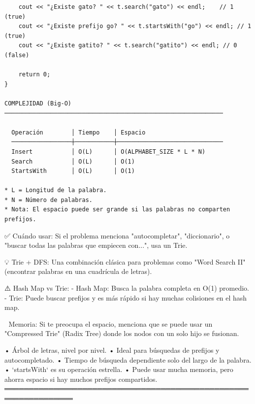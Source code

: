 \begin{lstlisting}
    cout << "¿Existe gato? " << t.search("gato") << endl;    // 1 (true)
    cout << "¿Existe prefijo go? " << t.startsWith("go") << endl; // 1 (true)
    cout << "¿Existe gatito? " << t.search("gatito") << endl; // 0 (false)

    return 0;
}

COMPLEJIDAD (Big-O)
──────────────────────────────────────────────────────────────

  Operación        │ Tiempo    │ Espacio
  ─────────────────┼───────────┼──────────────────────────────
  Insert           │ O(L)      │ O(ALPHABET_SIZE * L * N)
  Search           │ O(L)      │ O(1)
  StartsWith       │ O(L)      │ O(1)

* L = Longitud de la palabra.
* N = Número de palabras.
* Nota: El espacio puede ser grande si las palabras no comparten prefijos.
\end{lstlisting}

\begin{dsaentrevistas}

✅ Cuándo usar: Si el problema menciona "autocompletar", "diccionario",
   o "buscar todas las palabras que empiecen con...", usa un Trie.

💡 Trie + DFS: Una combinación clásica para problemas como 
   "Word Search II" (encontrar palabras en una cuadrícula de letras).

⚠️ Hash Map vs Trie: 
   - Hash Map: Busca la palabra completa en O(1) promedio.
   - Trie: Puede buscar prefijos y es más rápido si hay muchas colisiones
     en el hash map.

🔑 Memoria: Si te preocupa el espacio, menciona que se puede usar un
   "Compressed Trie" (Radix Tree) donde los nodos con un solo hijo 
   se fusionan.

\end{dsaentrevistas}

\begin{dsaresumen}

• Árbol de letras, nivel por nivel.
• Ideal para búsquedas de prefijos y autocompletado.
• Tiempo de búsqueda dependiente solo del largo de la palabra.
• `startsWith` es su operación estrella.
• Puede usar mucha memoria, pero ahorra espacio si hay muchos 
  prefijos compartidos.
════════════════════════════════════════════════════════════════

\end{dsaresumen}


